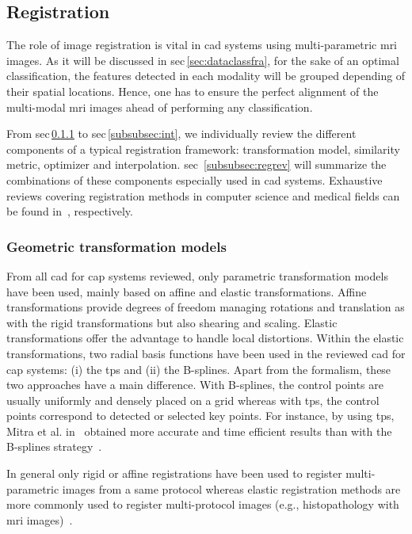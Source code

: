 \subsection{Registration} \label{subsec:registration}

The role of image registration is vital in \ac{cad} systems using multi-parametric \ac{mri} images. As it will be discussed in \ac{sec}\,\ref{sec:dataclassfra}, for the sake of an optimal classification, the features detected in each modality will be grouped depending of their spatial locations. Hence, one has to ensure the perfect alignment of the multi-modal \ac{mri} images ahead of performing any classification.

From \ac{sec}\,\ref{subsubsec:geotra} to \ac{sec}\,\ref{subsubsec:int}, we individually review the different components of a typical registration framework: transformation model, similarity metric, optimizer and interpolation. \Acl{sec}~\ref{subsubsec:regrev} will summarize the combinations of these components especially used in \ac{cad} systems. Exhaustive reviews covering registration methods in computer science and medical fields can be found in~\cite{Maintz1998,Zitova2003}, respectively.

\subsubsection{Geometric transformation models}\label{subsubsec:geotra}

From all \ac{cad} for \ac{cap} systems reviewed, only parametric transformation models have been used, mainly based on affine and elastic transformations. Affine transformations provide degrees of freedom managing rotations and translation as with the rigid transformations but also shearing and scaling. Elastic transformations offer the advantage to handle local distortions. Within the elastic transformations, two radial basis functions have been used in the reviewed \ac{cad} for \ac{cap} systems: (i) the \ac{tps} and (ii) the B-splines. Apart from the formalism, these two approaches have a main difference. With B-splines, the control points are usually uniformly and densely placed on a grid whereas with \ac{tps}, the control points correspond to detected or selected key points. For instance, by using \ac{tps}, Mitra et al. in~\cite{Mitra2011} obtained more accurate and time efficient results than with the B-splines strategy~\cite{Mitra2012a}.

In general only rigid or affine registrations have been used to register multi-parametric images from a same protocol whereas elastic registration methods are more commonly used to register multi-protocol images (e.g., histopathology with \ac{mri} images)~\cite{Toth2008,Toth2009}.

